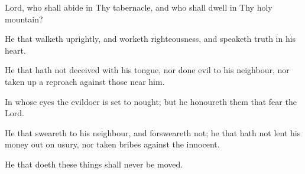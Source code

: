 Lord, who shall abide in Thy tabernacle, and who shall dwell in Thy holy mountain?

He that walketh uprightly, and worketh righteousness, and speaketh truth in his heart.

He that hath not deceived with his tongue, nor done evil to his neighbour, nor taken up a reproach against those near him.

In whose eyes the evildoer is set to nought; but he honoureth them that fear the Lord.

He that sweareth to his neighbour, and forsweareth not; he that hath not lent his money out on usury, nor taken bribes against the innocent.

He that doeth these things shall never be moved.
